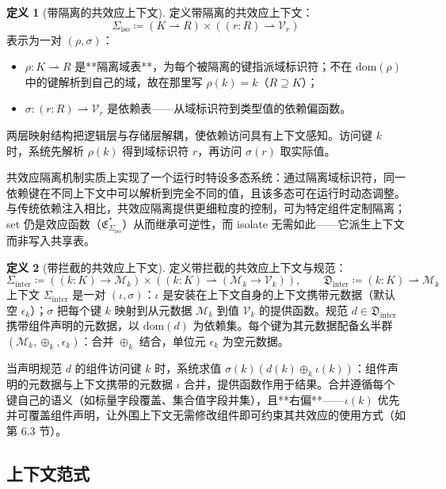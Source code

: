 \documentclass[11pt,a4paper]{article}
\theoremstyle{plain}
\theoremstyle{definition}
\newtheorem{definition}{定义}
\theoremstyle{remark}
\begin{document}
\begin{definition}[带隔离的共效应上下文]
定义带隔离的共效应上下文：
\[
\Sigma_{\mathrm{iso}} \coloneqq (K \rightharpoonup R) \times ((r : R) \rightharpoonup \mathcal{V}_r) \tag{27}
\]
表示为一对 $(\rho, \sigma)$：
\begin{itemize}
\item $\rho : K \rightharpoonup R$ 是**隔离域表**，为每个被隔离的键指派域标识符；不在 $\mathrm{dom}(\rho)$ 中的键解析到自己的域，故在那里写 $\rho(k) = k$（$R \supseteq K$）；
\item $\sigma : (r : R) \rightharpoonup \mathcal{V}_r$ 是依赖表——从域标识符到类型值的依赖偏函数。
\end{itemize}
两层映射结构把逻辑层与存储层解耦，使依赖访问具有上下文感知。访问键 $k$ 时，系统先解析 $\rho(k)$ 得到域标识符 $r$，再访问 $\sigma(r)$ 取实际值。
\end{definition}

共效应隔离机制实质上实现了一个运行时特设多态系统：通过隔离域标识符，同一依赖键在不同上下文中可以解析到完全不同的值，且该多态可在运行时动态调整。与传统依赖注入相比，共效应隔离提供更细粒度的控制，可为特定组件定制隔离；set 仍是效应函数（$\mathfrak{E}_{\Sigma_{\mathrm{iso}}}^\ast$）从而继承可逆性，而 isolate 无需如此——它派生上下文而非写入共享表。

\begin{definition}[带拦截的共效应上下文]
定义带拦截的共效应上下文与规范：
\[
\Sigma_{\mathrm{inter}} \coloneqq ((k : K) \to \mathcal{M}_k) \times ((k : K) \rightharpoonup (\mathcal{M}_k \to \mathcal{V}_k)), \qquad
\mathfrak{D}_{\mathrm{inter}} \coloneqq (k : K) \rightharpoonup \mathcal{M}_k \tag{29}
\]
上下文 $\Sigma_{\mathrm{inter}}$ 是一对 $(\iota, \sigma)$：$\iota$ 是安装在上下文自身的上下文携带元数据（默认空 $\epsilon_k$）；$\sigma$ 把每个键 $k$ 映射到从元数据 $\mathcal{M}_k$ 到值 $\mathcal{V}_k$ 的提供函数。规范 $d \in \mathfrak{D}_{\mathrm{inter}}$ 携带组件声明的元数据，以 $\mathrm{dom}(d)$ 为依赖集。每个键为其元数据配备幺半群 $(\mathcal{M}_k, \oplus_k, \epsilon_k)$：合并 $\oplus_k$ 结合，单位元 $\epsilon_k$ 为空元数据。
\end{definition}

当声明规范 $d$ 的组件访问键 $k$ 时，系统求值 $\sigma(k)(d(k) \oplus_k \iota(k))$：组件声明的元数据与上下文携带的元数据 $\iota$ 合并，提供函数作用于结果。合并遵循每个键自己的语义（如标量字段覆盖、集合值字段并集），且**右偏**——$\iota(k)$ 优先并可覆盖组件声明，让外围上下文无需修改组件即可约束其共效应的使用方式（如第 6.3 节）。

\subsection{上下文范式}
\end{document}
